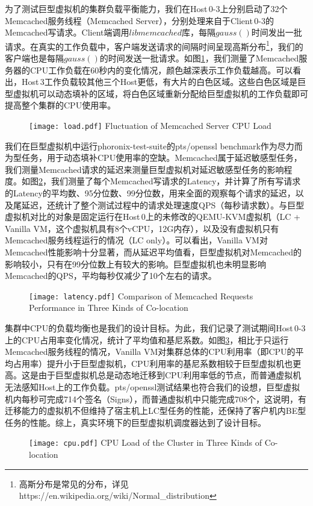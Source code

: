 为了测试巨型虚拟机的集群负载平衡能力，我们在Host\,0-3上分别启动了32个Memcached\cite{memcached}服务线程（Memcached Server），分别处理来自于Client\,0-3的Memcached写请求。Client端调用$libmemcached$库，每隔$gauss()$时间发出一批请求。在真实的工作负载中，客户端发送请求的间隔时间呈现高斯分布\footnote{高斯分布是常见的分布，详见https://en.wikipedia.org/wiki/Normal\_distribution}，我们的客户端也是每隔$gauss()$的时间发送一批请求。如图\ref{fig:load}，我们测量了Memcached服务器的CPU工作负载在60秒内的变化情况，颜色越深表示工作负载越高。可以看出，Host\,3工作负载较其他三个Host更低，有大片的白色区域。这些白色区域是巨型虚拟机可以动态填补的区域，将白色区域重新分配给巨型虚拟机的工作负载即可提高整个集群的CPU使用率。

\begin{figure}[!htp]
  \centering
  \texttt{[image: load.pdf]}
    {Fluctuation of Memcached Server CPU Load}
  \label{fig:load}
\end{figure}

我们在巨型虚拟机中运行phoronix-test-suite\cite{phoronix}的pts/openssl benchmark作为尽力而为型任务，用于动态填补CPU使用率的空缺。Memcached属于延迟敏感型任务，我们测量Memcached请求的延迟来测量巨型虚拟机对延迟敏感型任务的影响程度。如图\ref{fig:latency}，我们测量了每个Memcached写请求的Latency，并计算了所有写请求的Latency的平均数、95分位数、99分位数，用来全面的观察每个请求的延迟，以及尾延迟，还统计了整个测试过程中的请求处理速度QPS（每秒请求数）。与巨型虚拟机对比的对象是固定运行在Host\,0上的未修改的QEMU-KVM虚拟机（LC + Vanilla VM，这个虚拟机具有8个vCPU，12G内存），以及没有虚拟机只有Memcached服务线程运行的情况（LC only）。可以看出，Vanilla VM对Memcached性能影响十分显著，而从延迟平均值看，巨型虚拟机对Memcached的影响较小，只有在99分位数上有较大的影响。巨型虚拟机也未明显影响Memcached的QPS，平均每秒仅减少了10个左右的请求。

\begin{figure}[!htp]
  \centering
  \texttt{[image: latency.pdf]}
    {Comparison of Memcached Requests Performance in Three Kinds of Co-location}
  \label{fig:latency}
\end{figure}

集群中CPU的负载均衡也是我们的设计目标。为此，我们记录了测试期间Host\,0-3上的CPU占用率变化情况，统计了平均值和基尼系数。如图\ref{fig:cpuload}，相比于只运行Memcached服务线程的情况，Vanilla VM对集群总体的CPU利用率（即CPU的平均占用率）提升小于巨型虚拟机，CPU利用率的基尼系数相较于巨型虚拟机也更高。这是由于巨型虚拟机总是动态地迁移到CPU利用率低的节点，而普通虚拟机无法感知Host上的工作负载。pts/openssl测试结果也符合我们的设想，巨型虚拟机内每秒可完成714个签名（Signs），而普通虚拟机中只能完成708个，这说明，有迁移能力的虚拟机不但维持了宿主机上LC型任务的性能，还保持了客户机内BE型任务的性能。综上，真实环境下的巨型虚拟机调度器达到了设计目标。
\begin{figure}[!htp]
  \centering
  \texttt{[image: cpu.pdf]}
    {CPU Load of the Cluster in Three Kinds of Co-location}
  \label{fig:cpuload}
\end{figure}

